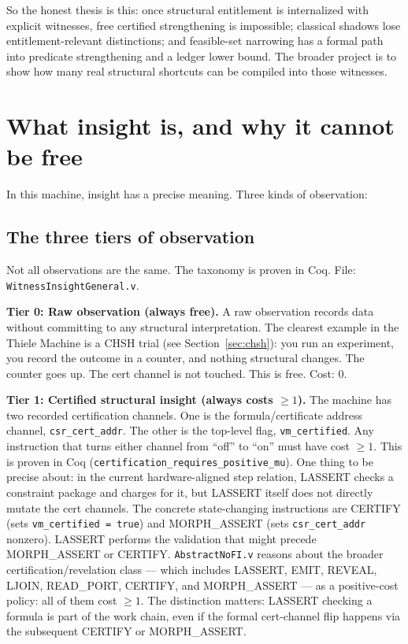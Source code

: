\documentclass[11pt,a4paper]{article}
\theoremstyle{plain}
\theoremstyle{definition}
\theoremstyle{remark}
\begin{document}
So the honest thesis is this: once structural entitlement is internalized with explicit witnesses, free certified strengthening is impossible; classical shadows lose entitlement-relevant distinctions; and feasible-set narrowing has a formal path into predicate strengthening and a ledger lower bound. The broader project is to show how many real structural shortcuts can be compiled into those witnesses.

\section{What insight is, and why it cannot be free}
\label{sec:insight}

In this machine, insight has a precise meaning. Three kinds of observation:

\subsection{The three tiers of observation}

Not all observations are the same. The taxonomy is proven in Coq. File: \texttt{WitnessInsightGeneral.v}.

\medskip
\noindent\textbf{Tier 0: Raw observation (always free).}
A raw observation records data without committing to any structural interpretation. The clearest example in the Thiele Machine is a CHSH trial (see Section~\ref{sec:chsh}): you run an experiment, you record the outcome in a counter, and nothing structural changes. The counter goes up. The cert channel is not touched. This is free. Cost: 0.

\medskip
\noindent\textbf{Tier 1: Certified structural insight (always costs $\geq 1$).}
The machine has two recorded certification channels. One is the formula/certificate address channel, \texttt{csr\_cert\_addr}. The other is the top-level flag, \texttt{vm\_certified}. Any instruction that turns either channel from ``off'' to ``on'' must have cost $\geq 1$. This is proven in Coq (\texttt{certification\_requires\_positive\_mu}). One thing to be precise about: in the current hardware-aligned step relation, LASSERT checks a constraint package and charges for it, but LASSERT itself does not directly mutate the cert channels. The concrete state-changing instructions are CERTIFY (sets \texttt{vm\_certified = true}) and MORPH\_ASSERT (sets \texttt{csr\_cert\_addr} nonzero). LASSERT performs the validation that might precede MORPH\_ASSERT or CERTIFY. \texttt{AbstractNoFI.v} reasons about the broader certification/revelation class --- which includes LASSERT, EMIT, REVEAL, LJOIN, READ\_PORT, CERTIFY, and MORPH\_ASSERT --- as a positive-cost policy: all of them cost $\geq 1$. The distinction matters: LASSERT checking a formula is part of the work chain, even if the formal cert-channel flip happens via the subsequent CERTIFY or MORPH\_ASSERT.
\end{document}
